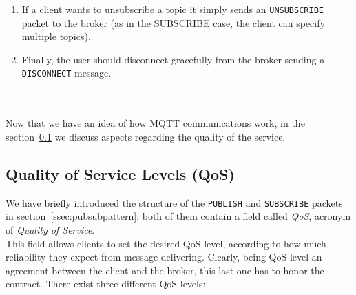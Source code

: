 \documentclass[12pt]{report}
\begin{document}
{\begin{enumerate}
\begin{itemize}
\setlength{\itemindent}{+4mm}
\item \emph{packetId} is a reference identifier to the current packet (it is unique per client)
\item \emph{topicName} is the topic we want to publish on
\item \emph{qos} and \emph{retainFlag} will be explained in details later
\item \emph{payload} is the actual content of the message
\item \emph{dupFlag} is a flag used to warn receivers that this message might have been already received
\end{itemize}

The broker will reply sending a \texttt{PUBREC} packet, used to let the client know that its message has been correctly received.
\bigskip \\
In the second case it will send a \texttt{SUBSCRIBE} packet, which contains multiple pairs \emph{(topic,qos)}, since a single packet can be used to subscribe to multiple topics.\\
Clearly, the broker will reply with a \texttt{SUBACK} packet, containing the return code for each topic the client is interested to.

\item If a client wants to unsubscribe a topic it simply sends an \texttt{UNSUBSCRIBE}  packet to the broker (as in the SUBSCRIBE case, the client can specify multiple topics).

\item Finally, the user should disconnect gracefully from the broker sending a \texttt{DISCONNECT} message.\\\\\\

\end{enumerate}
\bigskip

{\setlength{\parindent}{0cm}
Now that we have an idea of how MQTT communications work, in the section~\ref{ssec:qos} we discuss aspects regarding the quality of the service.
}

\clearpage

\subsection{Quality of Service Levels (QoS)}
\label{ssec:qos}

\bigskip
We have briefly introduced the structure of the \texttt{PUBLISH} and \texttt{SUBSCRIBE} packets in section~\ref{ssec:pubsubpattern}; both of them contain a field called \emph{QoS}, acronym of \emph{Quality of Service}.\\
This field allows clients to set the desired QoS level, according to how much reliability they expect from message delivering.
Clearly, being QoS level an agreement between the client and the broker, this last one has to honor the contract.
There exist three different QoS levels:

}
\end{document}
